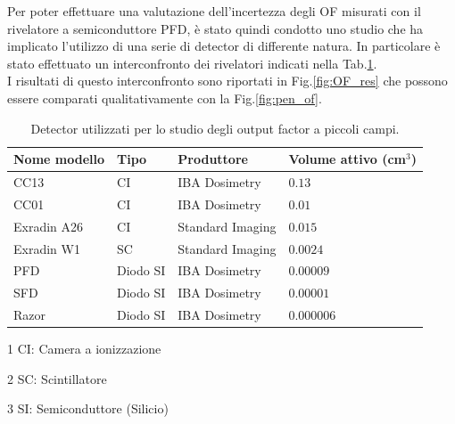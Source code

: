 Per poter effettuare una valutazione dell'incertezza degli OF misurati con il rivelatore a semiconduttore PFD, è stato quindi condotto uno studio che ha implicato l'utilizzo di una serie di detector di differente natura. In particolare è stato effettuato un interconfronto dei rivelatori indicati nella Tab.\ref{tab:OF_inter}.\\ I risultati di questo interconfronto sono riportati in Fig.\ref{fig:OF_res} che possono essere comparati qualitativamente con la Fig.\ref{fig:pen_of}.
\begin{table}[!t]
\centering
{}
\begin{threeparttable}
\begin{tabular}{llll}
\toprule
Nome modello & Tipo & Produttore & Volume attivo (cm$^3$)\\
\midrule
CC13 & CI\tnote{1} & IBA Dosimetry & $0.13$\\
CC01 & CI & IBA Dosimetry & $0.01$\\
Exradin A26 & CI & Standard Imaging & $0.015$ \\
Exradin W1 & SC\tnote{2} & Standard Imaging & $0.0024$ \\
PFD & Diodo SI\tnote{3} & IBA Dosimetry & $0.00009$ \\
SFD & Diodo SI & IBA Dosimetry & $0.00001$ \\
Razor & Diodo SI & IBA Dosimetry & $0.000006$ \\
\bottomrule
\end{tabular}
\begin{tablenotes}[para]
\item[1] CI: Camera a ionizzazione
\item[2] SC: Scintillatore
\item[3] SI: Semiconduttore (Silicio)
\end{tablenotes}
\end{threeparttable}
\caption{Detector utilizzati per lo studio degli output factor a piccoli campi.}
\label{tab:OF_inter}
\end{table}
